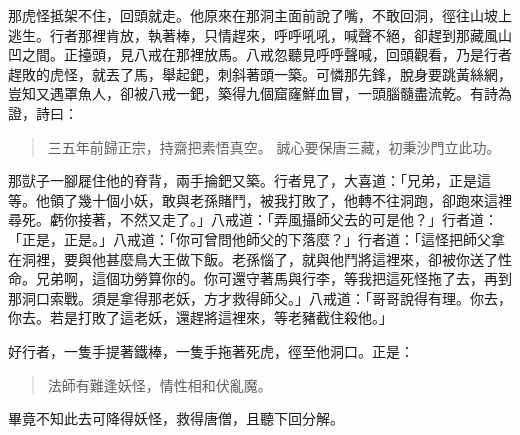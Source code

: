 那虎怪抵架不住，回頭就走。他原來在那洞主面前說了嘴，不敢回洞，徑往山坡上逃生。行者那裡肯放，執著棒，只情趕來，呼呼吼吼，喊聲不絕，卻趕到那藏風山凹之間。正擡頭，見八戒在那裡放馬。八戒忽聽見呼呼聲喊，回頭觀看，乃是行者趕敗的虎怪，就丟了馬，舉起鈀，刺斜著頭一築。可憐那先鋒，脫身要跳黃絲網，豈知又遇罩魚人，卻被八戒一鈀，築得九個窟窿鮮血冒，一頭腦髓盡流乾。有詩為證，詩曰：
\begin{quote}
三五年前歸正宗，持齋把素悟真空。
誠心要保唐三藏，初秉沙門立此功。
\end{quote}

那獃子一腳屣住他的脊背，兩手掄鈀又築。行者見了，大喜道：「兄弟，正是這等。他領了幾十個小妖，敢與老孫賭鬥，被我打敗了，他轉不往洞跑，卻跑來這裡尋死。虧你接著，不然又走了。」八戒道：「弄風攝師父去的可是他？」行者道：「正是，正是。」八戒道：「你可曾問他師父的下落麼？」行者道：「這怪把師父拿在洞裡，要與他甚麼鳥大王做下飯。老孫惱了，就與他鬥將這裡來，卻被你送了性命。兄弟啊，這個功勞算你的。你可還守著馬與行李，等我把這死怪拖了去，再到那洞口索戰。須是拿得那老妖，方才救得師父。」八戒道：「哥哥說得有理。你去，你去。若是打敗了這老妖，還趕將這裡來，等老豬截住殺他。」

好行者，一隻手提著鐵棒，一隻手拖著死虎，徑至他洞口。正是：
\begin{quote}
法師有難逢妖怪，情性相和伏亂魔。
\end{quote}

畢竟不知此去可降得妖怪，救得唐僧，且聽下回分解。
